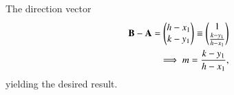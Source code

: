 The direction vector
\begin{align}
	\mathbf{B}-\mathbf{A}
	=
	\begin{pmatrix}
  h-x_1\\
  k-y_1
  \end{pmatrix}
   \equiv
	\begin{pmatrix}
1\\
	\frac{ k-y_1}{h-x_1}
  \end{pmatrix}
  \\
	\implies m = 
	\frac{ k-y_1}{h-x_1},
\end{align}
yielding the desired result.
